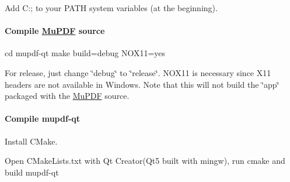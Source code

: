 Add C\-:; to your P\-A\-T\-H system variables (at the beginning).

\paragraph*{Compile \hyperlink{namespace_mu_p_d_f}{Mu\-P\-D\-F} source}

\begin{DoxyVerb}cd mupdf-qt
make build=debug NOX11=yes
\end{DoxyVerb}


For release, just change \char`\"{}debug\char`\"{} to \char`\"{}release\char`\"{}. N\-O\-X11 is necessary since X11 headers are not available in Windows. Note that this will not build the \char`\"{}app\char`\"{} packaged with the \hyperlink{namespace_mu_p_d_f}{Mu\-P\-D\-F} source.

\paragraph*{Compile mupdf-\/qt}

Install C\-Make.

Open C\-Make\-Lists.\-txt with Qt Creator(\-Qt5 built with mingw), run cmake and build mupdf-\/qt 